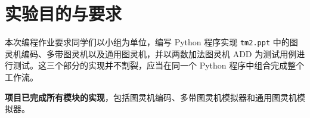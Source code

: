 \documentclass{sysucseexp}
\begin{document}

\makecover
\tableofcontents
\cleardoublepage
\pagestyle{main} %

\section{实验目的与要求}

本次编程作业要求同学们以小组为单位，编写 Python 程序实现 \texttt{tm2.ppt} 中的图灵机编码、多带图灵机以及通用图灵机，并以两数加法图灵机 ADD 为测试用例进行测试。这三个部分的实现并不割裂，应当在同一个 Python 程序中组合完成整个工作流。

\textbf{项目已完成所有模块的实现}，包括图灵机编码、多带图灵机模拟器和通用图灵机模拟器。
\end{document}
